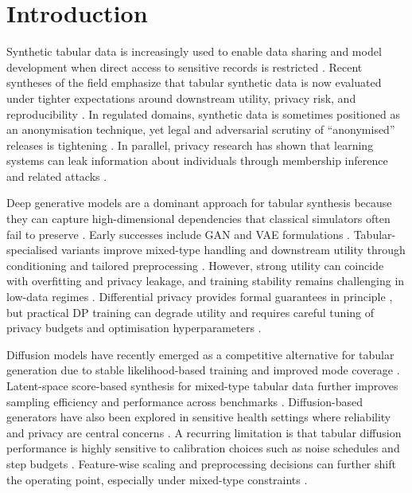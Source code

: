 \documentclass[preprint,12pt]{elsarticle}
\begin{document}

\section{Introduction}
Synthetic tabular data is increasingly used to enable data sharing and model development when direct access to sensitive records is restricted \cite{Kindji2025}. Recent syntheses of the field emphasize that tabular synthetic data is now evaluated under tighter expectations around downstream utility, privacy risk, and reproducibility \cite{cormode2025synthetic_tabular_kdd}. In regulated domains, synthetic data is sometimes positioned as an anonymisation technique, yet legal and adversarial scrutiny of ``anonymised'' releases is tightening \cite{Pilgram2025}. In parallel, privacy research has shown that learning systems can leak information about individuals through membership inference and related attacks \cite{Shokri2017}.

Deep generative models are a dominant approach for tabular synthesis because they can capture high-dimensional dependencies that classical simulators often fail to preserve \cite{Kindji2025}. Early successes include GAN and VAE formulations \cite{Goodfellow2014}. Tabular-specialised variants improve mixed-type handling and downstream utility through conditioning and tailored preprocessing \cite{Xu2019a}. However, strong utility can coincide with overfitting and privacy leakage, and training stability remains challenging in low-data regimes \cite{Alaa2022}. Differential privacy provides formal guarantees in principle \cite{Dwork2014}, but practical DP training can degrade utility and requires careful tuning of privacy budgets and optimisation hyperparameters \cite{Abadi2016}.

Diffusion models have recently emerged as a competitive alternative for tabular generation due to stable likelihood-based training and improved mode coverage \cite{Kotelnikov2023}. Latent-space score-based synthesis for mixed-type tabular data further improves sampling efficiency and performance across benchmarks \cite{Zhang2024}. Diffusion-based generators have also been explored in sensitive health settings where reliability and privacy are central concerns \cite{Tian2024}. A recurring limitation is that tabular diffusion performance is highly sensitive to calibration choices such as noise schedules and step budgets \cite{karras2022edm_neurips}. Feature-wise scaling and preprocessing decisions can further shift the operating point, especially under mixed-type constraints \cite{VillaizanVallelado2025}.
\end{document}
